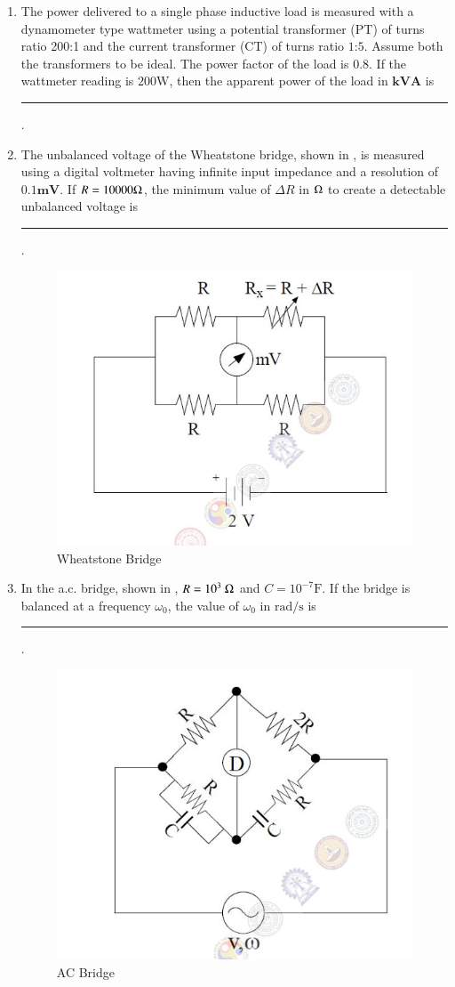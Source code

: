 \documentclass[journal,12pt,onecolumn]{IEEEtran}
\theoremstyle{remark}
\begin{document}
\begin{enumerate}
\item The power delivered to a single phase inductive load is measured with a dynamometer type wattmeter using a potential transformer (PT) of turns ratio 200:1 and the current
transformer (CT) of turns ratio $1$:$5$. Assume both the transformers to be ideal. The power
factor of the load is $0.8$. If the wattmeter reading is $200 \text{W}$, then the apparent power of the load in $\textbf{kVA}$ is \rule{1.5cm}{0.4pt}. \par \hfill{}

\item The unbalanced voltage of the Wheatstone bridge, shown in , is measured using a digital voltmeter having infinite input impedance and a resolution of $0.1 \textbf{mV}$. If $R=10000\ohm$, the minimum value of $\Delta R$ in $\ohm$ to create a detectable unbalanced voltage is \rule{1.5cm}{0.4pt}. \par \hfill{}
\begin{figure}[H]
    \centering
    \includegraphics[width=0.5\columnwidth]{Figs/Q-47.png}
    \caption{Wheatstone Bridge}
    \label{f-22}
\end{figure}

\item In the a.c. bridge, shown in , $R = 10^{3}\ \ohm$ and $C = 10^{-7}\text{F}$. If the bridge is balanced at a frequency $\omega_0$, the value of $\omega_0$ in $\text{rad/s}$ is \rule{1.5cm}{0.4pt}. \par \hfill{}
\begin{figure}[H]
    \centering
    \includegraphics[width=0.6\columnwidth]{Figs/Q-48.png}
    \caption{AC Bridge}
    \label{f-23}
\end{figure}


\end{enumerate}
\end{document}
